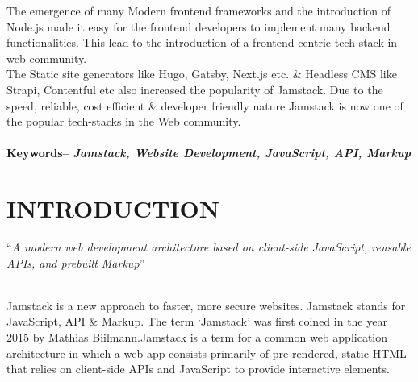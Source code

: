 \documentclass[12pt,a4paper,oneside]{report}
\renewcommand{\footrulewidth}{1.2pt}
\renewcommand{\headrulewidth}{1.2pt}
\begin{document}
\pre
The emergence of many Modern frontend frameworks and the introduction of Node.js made it easy for the frontend developers to implement many backend functionalities. This lead to the introduction of a frontend-centric tech-stack in web community.\\

\pre
The Static site generators like Hugo, Gatsby, Next.js etc. \& Headless CMS like Strapi, Contentful etc also increased the popularity of Jamstack. Due to the speed, reliable, cost efficient \& developer friendly nature Jamstack is now one of the popular tech-stacks in the Web community.
\\
\\\hspace{-.43in} 
\textbf{Keywords--} \textit{\textbf{Jamstack, Website Development, JavaScript, API, Markup }}

\tableofcontents
\listoffigures



\newpage
\pagestyle{fancy}
\headheight 26pt
\renewcommand{\footrulewidth}{1.2pt}
\renewcommand{\headrulewidth}{1.2pt}
\rhead{\scriptsize {\leftmark}}
\rfoot{\thepage}
\cfoot{\empty}
\chapter{INTRODUCTION}
\label{intro}

{
``\textit{A modern web development architecture based on client-side JavaScript, reusable APIs, and prebuilt Markup}''\\
}\\
\par
Jamstack is a new approach to faster, more secure websites. Jamstack stands for JavaScript, API \& Markup. The term `Jamstack' was first coined in the year 2015 by Mathias Biilmann.Jamstack is a term for a common web application architecture in which a web app consists primarily of pre-rendered, static HTML that relies on client-side APIs and JavaScript to provide interactive elements.\cite{official}
\end{document}
